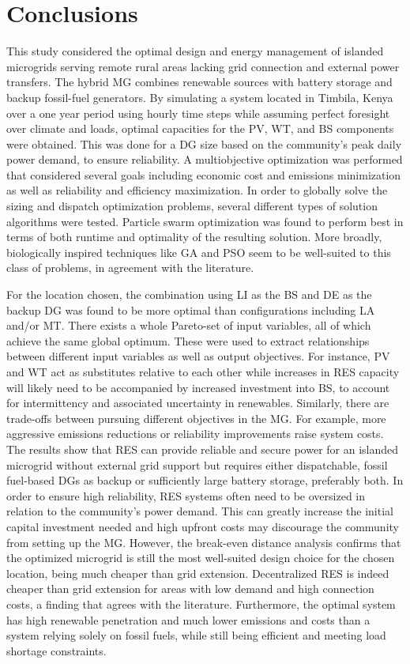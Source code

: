 \documentclass[final,3p,times]{elsarticle}
\begin{document}
\section{Conclusions}

This study considered the optimal design and energy management of islanded microgrids serving remote rural areas lacking grid connection and external power transfers. The hybrid MG combines renewable sources with battery storage and backup fossil-fuel generators. By simulating a system located in Timbila, Kenya over a one year period using hourly time steps while assuming perfect foresight over climate and loads, optimal capacities for the PV, WT, and BS components were obtained. This was done for a DG size based on the community's peak daily power demand, to ensure reliability. A multiobjective optimization was performed that considered several goals including economic cost and emissions minimization as well as reliability and efficiency maximization. In order to globally solve the sizing and dispatch optimization problems, several different types of solution algorithms were tested. Particle swarm optimization was found to perform best in terms of both runtime and optimality of the resulting solution. More broadly, biologically inspired techniques like GA and PSO seem to be well-suited to this class of problems, in agreement with the literature. 

For the location chosen, the combination using LI as the BS and DE as the backup DG was found to be more optimal than configurations including LA and/or MT. There exists a whole Pareto-set of input variables, all of which achieve the same global optimum. These were used to extract relationships between different input variables as well as output objectives. For instance, PV and WT act as substitutes relative to each other while increases in RES capacity will likely need to be accompanied by increased investment into BS, to account for intermittency and associated uncertainty in renewables. Similarly, there are trade-offs between pursuing different objectives in the MG. For example, more aggressive emissions reductions or reliability improvements raise system costs. The results show that RES can provide reliable and secure power for an islanded microgrid without external grid support but requires either dispatchable, fossil fuel-based DGs as backup or sufficiently large battery storage, preferably both. In order to ensure high reliability, RES systems often need to be oversized in relation to the community's power demand. This can greatly increase the initial capital investment needed and high upfront costs may discourage the community from setting up the MG. However, the break-even distance analysis confirms that the optimized microgrid is still the most well-suited design choice for the chosen location, being much cheaper than grid extension. Decentralized RES is indeed cheaper than grid extension for areas with low demand and high connection costs, a finding that agrees with the literature. Furthermore, the optimal system has high renewable penetration and much lower emissions and costs than a system relying solely on fossil fuels, while still being efficient and meeting load shortage constraints.
\end{document}
